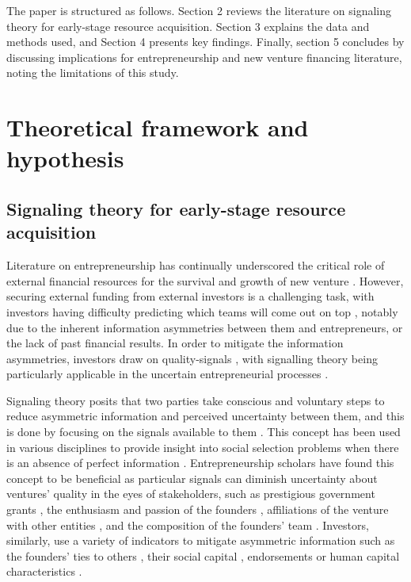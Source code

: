 \documentclass[12pt]{article}
\begin{document}
The paper is structured as follows. Section 2 reviews the literature on signaling theory for early-stage resource acquisition. Section 3 explains the data and methods used, and Section 4 presents key findings. Finally, section 5 concludes by discussing implications for entrepreneurship and new venture financing literature, noting the limitations of this study.

\section{Theoretical framework and hypothesis}

\subsection{Signaling theory for early-stage resource acquisition}

Literature on entrepreneurship has continually underscored the critical role of external financial resources for the survival and growth of new venture \citep{cooper1994initial, drover2017review, klein2020start}. However, securing external funding from external investors is a challenging task, with investors having difficulty predicting which teams will come out on top \citep{ghassemiautomated}, notably due to the inherent information asymmetries between them and entrepreneurs, or the lack of past financial results. In order to mitigate the information asymmetries, investors draw on quality-signals \citep{ko2018signaling, subramanian2022backing}, with signalling theory being particularly applicable in the uncertain entrepreneurial processes \citep{spence1978job}.

Signaling theory posits that two parties take conscious and voluntary steps to reduce asymmetric information and perceived uncertainty between them, and this is done by focusing on the signals available to them \citep{spence1974market}. This concept has been used in various disciplines to provide insight into social selection problems when there is an absence of perfect information \citep{connelly2011signaling, colombo2021use}. Entrepreneurship scholars have found this concept to be beneficial as particular signals can diminish uncertainty about ventures' quality in the eyes of stakeholders, such as prestigious government grants \citep{islam2018signaling}, the enthusiasm and passion of the founders \citep{chen2009entrepreneur}, affiliations of the venture with other entities \citep{plummer2016better}, and the composition of the founders' team \citep{ko2018signaling}. Investors, similarly, use a variety of indicators to mitigate asymmetric information such as the founders' ties to others \citep{shane2002network}, their social capital \citep{shane2002organizational}, endorsements \citep{courtney2017resolving, janney2006moderating, plummer2016better, gasiorowski2022pay} or human capital characteristics \citep{beckman2007early}.
\end{document}
